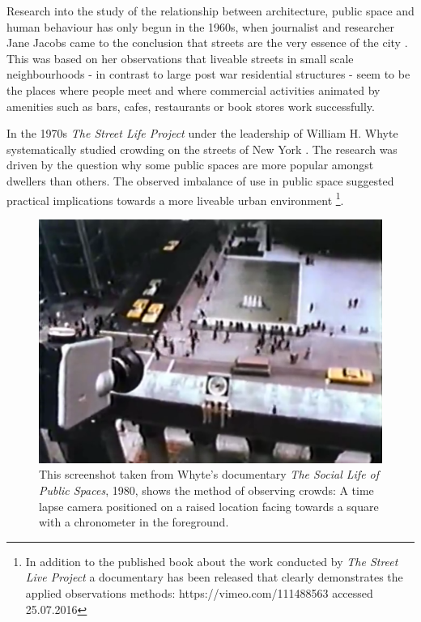 Research into the study of the relationship between architecture, public space and human behaviour has only begun in the 1960s, when journalist and researcher Jane Jacobs came to the conclusion that streets are the very essence of the city \cite{Jacobs_1961}. 
This was based on her observations that liveable streets in small scale neighbourhoods - in contrast to large post war residential structures -  seem to be the places where people meet and where commercial activities animated by amenities such as bars, cafes, restaurants or book stores work successfully. 

In the 1970s \textit{The Street Life Project} under the leadership of William H. Whyte systematically studied crowding on the streets of New York \label{fig:Whyte}. The research was driven by the question why some public spaces are more popular amongst dwellers than others. The observed imbalance of use in public space suggested practical implications towards a more liveable urban environment\cite{Whyte_1980} \footnote{In addition to the published book about the work conducted by \textit{The Street Live Project} a documentary has been released that clearly demonstrates the applied observations methods: https://vimeo.com/111488563 accessed 25.07.2016}.


\begin{figure}[!h] 
\centering
\includegraphics[width=\textwidth]{Illustrations/Whyte_SocialLife.png}
\caption [The Social Life of Public Spaces, 1980] {This screenshot taken from Whyte's documentary \textit{The Social Life of Public Spaces}, 1980, shows the method of observing crowds: A time lapse camera positioned on a raised location facing towards a square with a chronometer in the foreground.}
\label{Whyte}
\end{figure}

